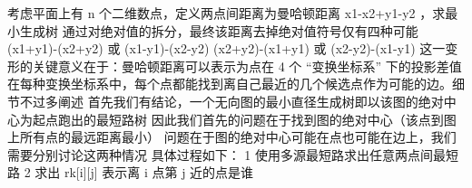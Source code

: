 {}
\markdownRendererSectionEnd \markdownRendererSectionBegin
{}\markdownRendererInterblockSeparator
{}考虑平面上有\markdownRendererDollarSign{} n \markdownRendererDollarSign{}个二维数点，定义两点间距离为曼哈顿距离\markdownRendererDollarSign{} \markdownRendererPipe{}x1-x2\markdownRendererPipe{}+\markdownRendererPipe{}y1-y2\markdownRendererPipe{} \markdownRendererDollarSign{}，求最小生成树\markdownRendererParagraphSeparator
{}通过对绝对值的拆分，最终该距离去掉绝对值符号仅有四种可能\markdownRendererParagraphSeparator
{}\markdownRendererDollarSign{} (x1+y1)-(x2+y2) \markdownRendererDollarSign{} 或\markdownRendererDollarSign{} (x1-y1)-(x2-y2) \markdownRendererDollarSign{}\markdownRendererParagraphSeparator
{}\markdownRendererDollarSign{} (x2+y2)-(x1+y1) \markdownRendererDollarSign{}或\markdownRendererDollarSign{} (x2-y2)-(x1-y1) \markdownRendererDollarSign{}\markdownRendererParagraphSeparator
{}这一变形的关键意义在于：曼哈顿距离可以表示为点在 4 个 “变换坐标系” 下的投影差值\markdownRendererParagraphSeparator
{}在每种变换坐标系中，每个点都能找到离自己最近的几个候选点作为可能的边。细节不过多阐述\markdownRendererInterblockSeparator
{}\markdownRendererInterblockSeparator
{}
\markdownRendererSectionEnd \markdownRendererSectionBegin
{}\markdownRendererInterblockSeparator
{}首先我们有结论，一个无向图的最小直径生成树即以该图的绝对中心为起点跑出的最短路树\markdownRendererParagraphSeparator
{}因此我们首先的问题在于找到图的绝对中心（该点到图上所有点的最远距离最小）\markdownRendererParagraphSeparator
{}问题在于图的绝对中心可能在点也可能在边上，我们需要分别讨论这两种情况\markdownRendererParagraphSeparator
{}具体过程如下：\markdownRendererParagraphSeparator
{}\markdownRendererDollarSign{} 1 \markdownRendererDollarSign{}使用多源最短路求出任意两点间最短路\markdownRendererParagraphSeparator
{}\markdownRendererDollarSign{} 2 \markdownRendererDollarSign{}求出\markdownRendererDollarSign{} rk[i][j] \markdownRendererDollarSign{}表示离\markdownRendererDollarSign{} i \markdownRendererDollarSign{}点第\markdownRendererDollarSign{} j \markdownRendererDollarSign{}近的点是谁\markdownRendererParagraphSeparator
